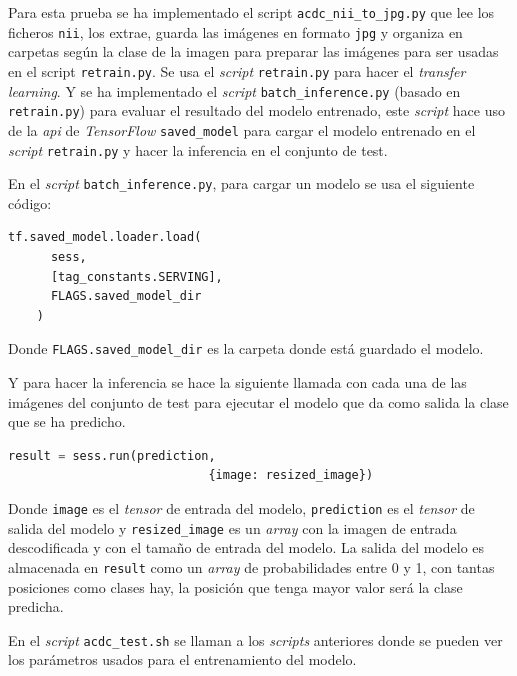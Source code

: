 \documentclass[12pt,a4paper]{article}
\begin{document}
Para esta prueba se ha implementado el script \texttt{acdc\_nii\_to\_jpg.py} que lee los ficheros \texttt{nii}, los extrae, guarda las imágenes en formato \texttt{jpg} y organiza en carpetas según la clase de la imagen para preparar las imágenes para ser usadas en el script \texttt{retrain.py}. Se usa el \textit{script} \texttt{retrain.py} para hacer el \textit{transfer learning}. Y se ha implementado el \textit{script} \texttt{batch\_inference.py} (basado en \texttt{retrain.py}) para evaluar el resultado del modelo entrenado, este \textit{script} hace uso de la \textit{api} de \textit{TensorFlow} \texttt{saved\_model} para cargar el modelo entrenado en el \textit{script} \texttt{retrain.py} y hacer la inferencia en el conjunto de test.
\bigskip

En el \textit{script} \texttt{batch\_inference.py}, para cargar un modelo se usa el siguiente código:

\begin{lstlisting}[language=Python]
    tf.saved_model.loader.load(
      sess,
      [tag_constants.SERVING],
      FLAGS.saved_model_dir
    )
\end{lstlisting}

Donde \texttt{FLAGS.saved\_model\_dir} es la carpeta donde está guardado el modelo.
\bigskip

Y para hacer la inferencia se hace la siguiente llamada con cada una de las imágenes del conjunto de test para ejecutar el modelo que da como salida la clase que se ha predicho.

\begin{lstlisting}[language=Python]
          result = sess.run(prediction,
                            {image: resized_image})
\end{lstlisting}

Donde \texttt{image} es el \textit{tensor} de entrada del modelo, \texttt{prediction} es el \textit{tensor} de salida del modelo y \texttt{resized\_image} es un \textit{array} con la imagen de entrada descodificada y con el tamaño de entrada del modelo. La salida del modelo es almacenada en \texttt{result} como un \textit{array} de probabilidades entre 0 y 1, con tantas posiciones como clases hay, la posición que tenga mayor valor será la clase predicha.
\bigskip

En el \textit{script} \texttt{acdc\_test.sh} se llaman a los \textit{scripts} anteriores donde se pueden ver los parámetros usados para el entrenamiento del modelo.
\end{document}

